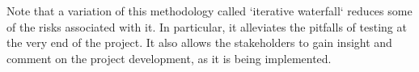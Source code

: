 \documentclass[11pt]{article}
\begin{document}
  
  
  

Note that a variation of this methodology called `iterative waterfall` reduces some of the risks associated with it. In particular, it alleviates the pitfalls of testing at the very end of the project. It also allows the stakeholders to gain insight and comment on the project development, as it is being implemented.
\end{document}
